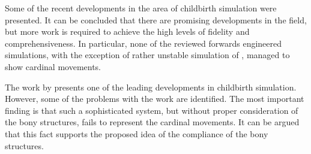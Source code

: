 Some of the recent developments in the area of childbirth simulation were presented. It can be concluded that there are promising developments in the field, but more work is required to achieve the high levels of fidelity and comprehensiveness. In particular, none of the reviewed forwards engineered simulations, with the exception of rather unstable simulation of \citet{GEIGER}, managed to show cardinal movements.

The work by \citet{BUTTIN} presents one of the leading developments in childbirth simulation. However, some of the problems with the work are identified. The most important finding is that such a sophisticated system, but without proper consideration of the bony structures, fails to represent the cardinal movements. It can be argued that this fact supports the proposed idea of the compliance of the bony structures.
